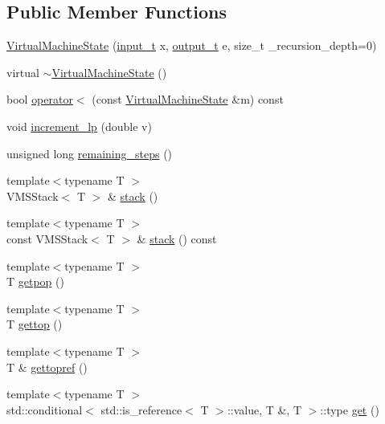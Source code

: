 \subsection*{Public Member Functions}
\begin{DoxyCompactItemize}
\item 
\hyperlink{class_virtual_machine_state_a29c8e836431bb281d86215bf6f3e54d9}{Virtual\+Machine\+State} (\hyperlink{class_virtual_machine_state_a04c5592dddd5b9ffdae5a509d73127dd}{input\+\_\+t} x, \hyperlink{class_virtual_machine_state_a005a025f97d9505b00e7f9f0e99002bb}{output\+\_\+t} e, size\+\_\+t \+\_\+recursion\+\_\+depth=0)
\item 
virtual \hyperlink{class_virtual_machine_state_ac18b114e8adb2d8f218c5e6e7022ff2b}{$\sim$\+Virtual\+Machine\+State} ()
\item 
bool \hyperlink{class_virtual_machine_state_a213400a3e616f8d1a2041491ea4c782e}{operator$<$} (const \hyperlink{class_virtual_machine_state}{Virtual\+Machine\+State} \&m) const
\item 
void \hyperlink{class_virtual_machine_state_a160c5e22c2acd3997d0bb188ce296b2f}{increment\+\_\+lp} (double v)
\item 
unsigned long \hyperlink{class_virtual_machine_state_ae76dbfbf78879b1b0421720e635467a0}{remaining\+\_\+steps} ()
\item 
{\footnotesize template$<$typename T $>$ }\\V\+M\+S\+Stack$<$ T $>$ \& \hyperlink{class_virtual_machine_state_a580428f53e64cde8aef3c0a6a79838ec}{stack} ()
\item 
{\footnotesize template$<$typename T $>$ }\\const V\+M\+S\+Stack$<$ T $>$ \& \hyperlink{class_virtual_machine_state_adc77f615f164e83ee4a25f06b3a5b64d}{stack} () const
\item 
{\footnotesize template$<$typename T $>$ }\\T \hyperlink{class_virtual_machine_state_a5c5373c434e10372d9e9a17df1532965}{getpop} ()
\item 
{\footnotesize template$<$typename T $>$ }\\T \hyperlink{class_virtual_machine_state_ac5a22fb0fbfa599bcb5e6a5961598815}{gettop} ()
\item 
{\footnotesize template$<$typename T $>$ }\\T \& \hyperlink{class_virtual_machine_state_a158edda7fbaf5e64b60f7723877cd608}{gettopref} ()
\item 
{\footnotesize template$<$typename T $>$ }\\std\+::conditional$<$ std\+::is\+\_\+reference$<$ T $>$\+::value, T \&, T $>$\+::type \hyperlink{class_virtual_machine_state_a28d07f08745840f202822f02dee947ed}{get} ()

\end{DoxyCompactItemize}
